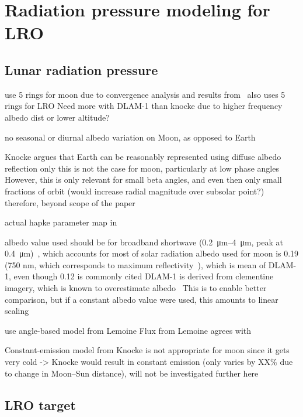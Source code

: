 \section{Radiation pressure modeling for LRO}

\subsection{Lunar radiation pressure}
use 5 rings for moon due to convergence analysis and results from~\cite{Floberghagen1999}
\cite{Nicholson2010} also uses 5 rings for LRO
Need more with DLAM-1 than knocke due to higher frequency albedo dist or lower altitude?


no seasonal or diurnal albedo variation on Moon, as opposed to Earth~\cite{Knocke1989}

Knocke argues that Earth can be reasonably represented using diffuse albedo reflection only
this is not the case for moon, particularly at low phase angles~\cite{Shkuratov2011}
However, this is only relevant for small beta angles, and even then only small fractions of orbit (would increase radial magnitude over subsolar point?)
therefore, beyond scope of the paper

actual hapke parameter map in \cite{Sato2014}

albedo value used should be for broadband shortwave (\qtyrange{0.2}{4}{\micro\meter}, peak at \qty{0.4}{\micro\meter})~\cite{Knocke1989}, which accounts for most of solar radiation
albedo used for moon is 0.19 (750 nm, which corresponds to maximum reflectivity~\cite{Floberghagen1999}), which is mean of DLAM-1, even though 0.12 is commonly cited
DLAM-1 is derived from clementine imagery, which is known to overestimate albedo~\cite{Shkuratov2011}
This is to enable better comparison, but if a constant albedo value were used, this amounts to linear scaling



use angle-based model from Lemoine
Flux from Lemoine agrees with \cite[Table~8]{Tooley2010}

Constant-emission model from Knocke is not appropriate for moon since it gets very cold -> Knocke would result in constant emission (only varies by XX\% due to change in Moon--Sun distance), will not be investigated further here

\subsection{LRO target}

